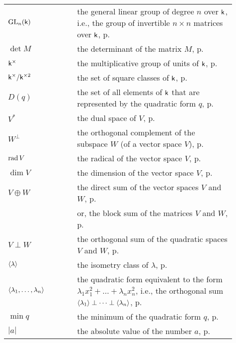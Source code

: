 \begin{longtable}{p{0.25\linewidth} p{0.01\linewidth} p{0.65\linewidth}}
    \(\mathrm{GL}_{n}(\mathsf{k})\) && the general linear group of degree \(n\) over \(\mathsf{k}\), i.e., the group of invertible \(n \times n\) matrices over \(\mathsf{k}\), p.\,\pageref{sec:quadratic-space-change-of-basis}\\
    \(\det M\) && the determinant of the matrix \(M\), p.\,\pageref{sec:quadratic-space-change-of-basis}\\
    \(\mathsf{k}^{\times}\) && the multiplicative group of units of \(\mathsf{k}\), p.\,\pageref{sec:square-classes}\\
    \(\mathsf{k}^{\times}/\mathsf{k}^{\times2}\) && the set of square classes of \(\mathsf{k}\), p.\,\pageref{sec:square-classes}\\
    \(D(q)\) && the set of all elements of \(\mathsf{k}\) that are represented by the quadratic form \(q\), p.\,\pageref{sec:representation}\\ 
    \(V^*\) && the dual space of \(V\), p.\,\pageref{sec:nondegenerate}\\
    \(W^{\perp}\) && the orthogonal complement of the subspace \(W\) (of a vector space \(V\)), p.\,\pageref{sec:orthogonality}\\
    \(\operatorname{rad} V\) && the radical of the vector space \(V\), p.\,\pageref{sec:orthogonality}\\
    \(\dim V\) && the dimension of the vector space \(V\), p.\,\pageref{sec:orthogonality}\\
    \(V \oplus W\) && the direct sum of the vector spaces \(V\) and \(W\), p.\,\pageref{sec:orthogonal-sum}\\
    && or, the block sum of the matrices \(V\) and \(W\), p.\,\pageref{eq:orthogonal-sum-as-block-sum}\\
    \(V \perp W\) && the orthogonal sum of the quadratic spaces \(V\) and \(W\), p.\,\pageref{sec:orthogonal-sum}\\
    \(\langle \lambda \rangle\) && the isometry class of \(\lambda\), p.\,\pageref{sec:lambda-class}\\
    \(\langle \lambda_1, \dots, \lambda_n \rangle\) && the quadratic form equivalent to the form \(\lambda_1 x_1^2 + \dots + \lambda_n x_n^2\), i.e., the orthogonal sum \(\langle \lambda_1 \rangle \perp \dots \perp \langle \lambda_n \rangle\), p.\,\pageref{sec:lambda-class}\\
    \(\min q\) && the minimum of the quadratic form \(q\), p.\,\pageref{sec:minimum}\\
    \(|a|\) && the absolute value of the number \(a\), p.\,\pageref{sec:minimum}\\

\end{longtable}
